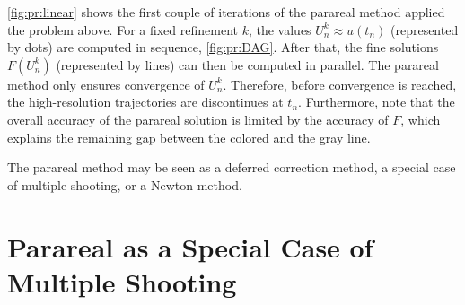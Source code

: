 \begin{example}
  \autoref{fig:pr:linear} shows the first couple of iterations of the parareal method applied the problem above.
  For a fixed refinement $k$,
  the values $U^k_n \approx u(t_n)$ (represented by dots) are computed in sequence,
  \cf \autoref{fig:pr:DAG}.
  After that, the fine solutions $F(U_n^k)$ (represented by lines) can then be computed in parallel.
  The parareal method only ensures convergence of $U_n^k$.
  Therefore, before convergence is reached,
  the high-resolution trajectories are discontinues at $t_n$.
  Furthermore, note that the overall accuracy of the parareal solution is limited by the accuracy of $F$,
  which explains the remaining gap between the colored and the gray line.
\end{example}

The parareal method may be seen \eg as a deferred correction method,
a special case of multiple shooting, or a Newton method.

\section{Parareal as a Special Case of Multiple Shooting}
\label{sec:pr:newton}

